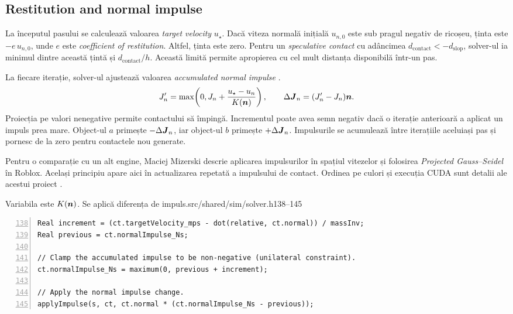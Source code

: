 \documentclass[11pt,a4paper]{article}
\begin{document}
\subsection{Restitution and normal impulse}

La începutul pasului se calculează valoarea \emph{target velocity} \(u_\star\).
Dacă viteza normală inițială \(u_{n,0}\) este sub pragul negativ
de ricoșeu, ținta este \(-e\,u_{n,0}\), unde \(e\) este
\emph{coefficient of restitution}. Altfel, ținta este zero. Pentru un
\emph{speculative contact} cu adâncimea \(d_{\mathrm{contact}}<-d_{\mathrm{slop}}\),
solver-ul ia minimul dintre această țintă și \(d_{\mathrm{contact}}/h\). Această limită
permite apropierea cu cel mult distanța disponibilă într-un pas.

La fiecare iterație, solver-ul ajustează valoarea \emph{accumulated normal impulse}
\cite{catto}.
\begin{equation}
 J_n'=\max\!\left(0,J_n+
             \frac{u_\star-u_n}{K(\boldsymbol{n})}\right),\qquad
 \Delta\boldsymbol{J}_n=(J_n'-J_n)\boldsymbol{n} .
\end{equation}
Proiecția pe valori nenegative permite contactului să împingă.
Incrementul poate avea semn negativ dacă o iterație anterioară
a aplicat un impuls prea mare. Object-ul \(a\) primește
\(-\Delta\boldsymbol{J}_n\), iar object-ul \(b\) primește
\(+\Delta\boldsymbol{J}_n\). Impulsurile se acumulează între iterațiile
aceluiași pas și pornesc de la zero pentru contactele nou generate.

Pentru o comparație cu un alt engine, Maciej Mizerski descrie
aplicarea impulsurilor în spațiul vitezelor și folosirea
\emph{Projected Gauss--Seidel} în Roblox. Același principiu apare aici
în actualizarea repetată a impulsului de contact. Ordinea pe culori
și execuția CUDA sunt detalii ale acestui proiect \cite{medium-roblox}.
\begin{codefragment}{Variabila  este \(K(\boldsymbol{n})\). Se aplică diferența de impuls.}{src/shared/sim/solver.h}{138--145}
\begin{lstlisting}[numbers=left,firstnumber=138]
Real increment = (ct.targetVelocity_mps - dot(relative, ct.normal)) / massInv;
Real previous = ct.normalImpulse_Ns;

// Clamp the accumulated impulse to be non-negative (unilateral constraint).
ct.normalImpulse_Ns = maximum(0, previous + increment);

// Apply the normal impulse change.
applyImpulse(s, ct, ct.normal * (ct.normalImpulse_Ns - previous));
\end{lstlisting}
\end{codefragment}
\end{document}
